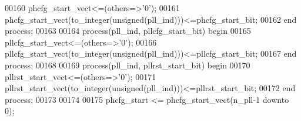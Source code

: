 \begin{DoxyCode}
00160     \textcolor{vhdlchar}{phcfg_start_vect}\textcolor{vhdlchar}{<=}\textcolor{vhdlchar}{(}\textcolor{keywordflow}{others}\textcolor{vhdlchar}{=}\textcolor{vhdlchar}{>}\textcolor{vhdlchar}{'}\textcolor{vhdllogic}{}\textcolor{vhdllogic}{0}\textcolor{vhdlchar}{'}\textcolor{vhdlchar}{)};
00161     \textcolor{vhdlchar}{phcfg_start_vect}\textcolor{vhdlchar}{(}\textcolor{vhdlchar}{to\_integer}\textcolor{vhdlchar}{(}\textcolor{comment}{unsigned}\textcolor{vhdlchar}{(}\textcolor{vhdlchar}{pll_ind}\textcolor{vhdlchar}{)}\textcolor{vhdlchar}{)}\textcolor{vhdlchar}{)}\textcolor{vhdlchar}{<=}\textcolor{vhdlchar}{phcfg_start_bit};
00162 \textcolor{keywordflow}{end} \textcolor{keywordflow}{process};
00163 
00164 \textcolor{keywordflow}{process}(pll_ind, pllcfg_start_bit) \textcolor{keywordflow}{begin}
00165     \textcolor{vhdlchar}{pllcfg_start_vect}\textcolor{vhdlchar}{<=}\textcolor{vhdlchar}{(}\textcolor{keywordflow}{others}\textcolor{vhdlchar}{=}\textcolor{vhdlchar}{>}\textcolor{vhdlchar}{'}\textcolor{vhdllogic}{}\textcolor{vhdllogic}{0}\textcolor{vhdlchar}{'}\textcolor{vhdlchar}{)};
00166     \textcolor{vhdlchar}{pllcfg_start_vect}\textcolor{vhdlchar}{(}\textcolor{vhdlchar}{to\_integer}\textcolor{vhdlchar}{(}\textcolor{comment}{unsigned}\textcolor{vhdlchar}{(}\textcolor{vhdlchar}{pll_ind}\textcolor{vhdlchar}{)}\textcolor{vhdlchar}{)}\textcolor{vhdlchar}{)}\textcolor{vhdlchar}{<=}\textcolor{vhdlchar}{pllcfg_start_bit};
00167 \textcolor{keywordflow}{end} \textcolor{keywordflow}{process};
00168 
00169 \textcolor{keywordflow}{process}(pll_ind, pllrst_start_bit) \textcolor{keywordflow}{begin}
00170     \textcolor{vhdlchar}{pllrst_start_vect}\textcolor{vhdlchar}{<=}\textcolor{vhdlchar}{(}\textcolor{keywordflow}{others}\textcolor{vhdlchar}{=}\textcolor{vhdlchar}{>}\textcolor{vhdlchar}{'}\textcolor{vhdllogic}{}\textcolor{vhdllogic}{0}\textcolor{vhdlchar}{'}\textcolor{vhdlchar}{)};
00171     \textcolor{vhdlchar}{pllrst_start_vect}\textcolor{vhdlchar}{(}\textcolor{vhdlchar}{to\_integer}\textcolor{vhdlchar}{(}\textcolor{comment}{unsigned}\textcolor{vhdlchar}{(}\textcolor{vhdlchar}{pll_ind}\textcolor{vhdlchar}{)}\textcolor{vhdlchar}{)}\textcolor{vhdlchar}{)}\textcolor{vhdlchar}{<=}\textcolor{vhdlchar}{pllrst_start_bit};
00172 \textcolor{keywordflow}{end} \textcolor{keywordflow}{process};
00173 
00174 
00175 \textcolor{vhdlchar}{phcfg_start}  \textcolor{vhdlchar}{<=} \textcolor{vhdlchar}{phcfg_start_vect}\textcolor{vhdlchar}{(}\textcolor{vhdlchar}{n_pll}\textcolor{vhdlchar}{-}\textcolor{vhdllogic}{}\textcolor{vhdllogic}{1} \textcolor{keywordflow}{downto} \textcolor{vhdllogic}{}\textcolor{vhdllogic}{0}\textcolor{vhdlchar}{)};

\end{DoxyCode}
